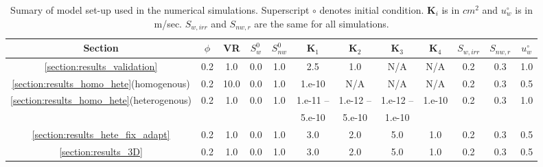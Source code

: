 
\begin{landscape}
\begin{table}
  \begin{tabular}{c | c c  c  c  c  c  c  c  c  c   c}
    \hline
      {\bf Section} & $\phi$ & VR  & $S^{0}_{w}$ & $S^{0}_{nw}$ & $\mathbf{K}_{1}$ & $\mathbf{K}_{2}$ & $\mathbf{K}_{3}$ & $\mathbf{K}_{4}$ & $S_{w,irr}$ & $S_{nw,r}$ & $u^{\circ}_{w}$ \\ 
    \hline
     \ref{section:results_validation} & 0.2 & 1.0 & 0.0 & 1.0 & 2.5 & 1.0 & N/A & N/A & 0.2 & 0.3 & 1.0 \\
     \ref{section:results_homo_hete}(homogenous)  & 0.2 & 10.0 & 0.0 & 1.0 & 1.e-10 & N/A & N/A & N/A & 0.2 & 0.3 & 0.5  \\
     \ref{section:results_homo_hete}(heterogenous) & 0.2 & 1.0 & 0.0 & 1.0 & 1.e-11 -- & 1.e-12 -- & 1.e-12 -- & 1.e-10 & 0.2  & 0.3 & 1.0 \\
      &   &  &  &  & 5.e-10 & 5.e-10 & 1.e-10  &  &  &  & \\
     \ref{section:results_hete_fix_adapt}  & 0.2 & 1.0 & 0.0 & 1.0  & 3.0 & 2.0 & 5.0 & 1.0 & 0.2 & 0.3 & 0.5  \\
     \ref{section:results_3D}  & 0.2 & 1.0 & 0.0 & 1.0 & 3.0 & 2.0 & 5.0 & 1.0 & 0.2  & 0.3 & 0.5  \\
     \hline
   \end{tabular}
   \caption{Sumary of model set-up used in the numerical simulations. Superscript $\circ$ denotes initial condition. $\mathbf{K}_{i}$ is in $cm^{2}$ and $u^{\circ}_{w}$ is in m/sec. $S_{w,irr}$ and $S_{nw,r}$ are the same for all simulations.  }
\label{table:setup}
\end{table}
\end{landscape}
\clearpage



